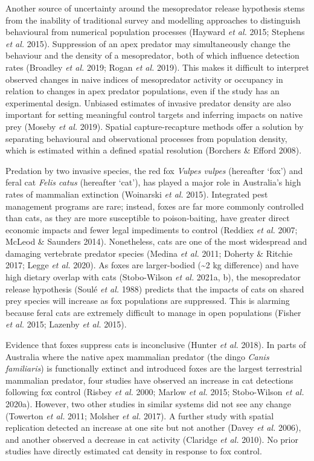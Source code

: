 \documentclass[11pt,a4paper,titlepage,twoside,openright]{style/unimelbthesis}
\begin{document}
\begin{mainmatter}
Another source of uncertainty around the mesopredator release hypothesis stems from the inability of traditional survey and modelling approaches to distinguish behavioural from numerical population processes (Hayward \emph{et al.} 2015; Stephens \emph{et al.} 2015). Suppression of an apex predator may simultaneously change the behaviour and the density of a mesopredator, both of which influence detection rates (Broadley \emph{et al.} 2019; Rogan \emph{et al.} 2019). This makes it difficult to interpret observed changes in naive indices of mesopredator activity or occupancy in relation to changes in apex predator populations, even if the study has an experimental design. Unbiased estimates of invasive predator density are also important for setting meaningful control targets and inferring impacts on native prey (Moseby \emph{et al.} 2019). Spatial capture-recapture methods offer a solution by separating behavioural and observational processes from population density, which is estimated within a defined spatial resolution (Borchers \& Efford 2008).

Predation by two invasive species, the red fox \emph{Vulpes vulpes} (hereafter `fox') and feral cat \emph{Felis catus} (hereafter `cat'), has played a major role in Australia's high rates of mammalian extinction (Woinarski \emph{et al.} 2015). Integrated pest management programs are rare; instead, foxes are far more commonly controlled than cats, as they are more susceptible to poison-baiting, have greater direct economic impacts and fewer legal impediments to control (Reddiex \emph{et al.} 2007; McLeod \& Saunders 2014). Nonetheless, cats are one of the most widespread and damaging vertebrate predator species (Medina \emph{et al.} 2011; Doherty \& Ritchie 2017; Legge \emph{et al.} 2020). As foxes are larger-bodied (\textasciitilde2 kg difference) and have high dietary overlap with cats (Stobo-Wilson \emph{et al.} 2021a, b), the mesopredator release hypothesis (Soulé \emph{et al.} 1988) predicts that the impacts of cats on shared prey species will increase as fox populations are suppressed. This is alarming because feral cats are extremely difficult to manage in open populations (Fisher \emph{et al.} 2015; Lazenby \emph{et al.} 2015).

Evidence that foxes suppress cats is inconclusive (Hunter \emph{et al.} 2018). In parts of Australia where the native apex mammalian predator (the dingo \emph{Canis familiaris}) is functionally extinct and introduced foxes are the largest terrestrial mammalian predator, four studies have observed an increase in cat detections following fox control (Risbey \emph{et al.} 2000; Marlow \emph{et al.} 2015; Stobo-Wilson \emph{et al.} 2020a). However, two other studies in similar systems did not see any change (Towerton \emph{et al.} 2011; Molsher \emph{et al.} 2017). A further study with spatial replication detected an increase at one site but not another (Davey \emph{et al.} 2006), and another observed a decrease in cat activity (Claridge \emph{et al.} 2010). No prior studies have directly estimated cat density in response to fox control.


\end{mainmatter}
\end{document}
